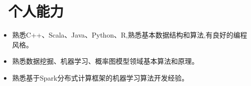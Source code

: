 \documentclass{resume}
\begin{document}



\section{\faCogs\ 个人能力}
\begin{itemize}[parsep=0.5ex]
  \item 熟悉C++、Scala、Java、Python、R,熟悉基本数据结构和算法,有良好的编程风格。
  \item 熟悉数据挖掘、机器学习、概率图模型领域基本算法和原理。
  \item 熟悉基于Spark分布式计算框架的机器学习算法开发经验。
  
\end{itemize}


%
%
\end{document}
